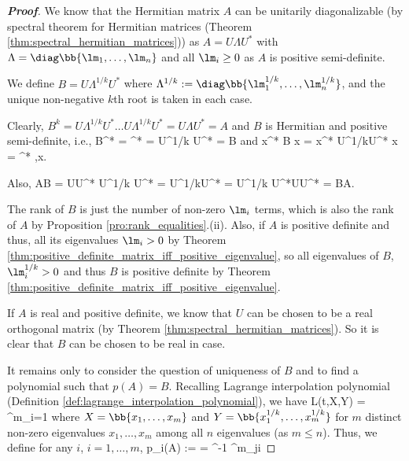 \begin{proof}[\bf Proof]
We know that the Hermitian matrix $A$ can be unitarily diagonalizable (by spectral theorem for Hermitian matrices (Theorem \ref{thm:spectral_hermitian_matrices})) as $A = U\Lambda U^*$ with $\Lambda
= \diag\bb{\lm_1,\dots,\lm_n}$ and all $\lm_i \geq 0$ as $A$ is positive semi-definite.

We define $B = U\Lambda^{1/k} U^*$ where $\Lambda^{1/k} := \diag\bb{\lm_1^{1/k},\dots,\lm_n^{1/k}}$, and the unique non-negative $k$th root is taken in each case.

Clearly, $B^k = U\Lambda^{1/k}U^* \dots U\Lambda^{1/k}U^* = U\Lambda U^* = A$ and $B$ is Hermitian and positive semi-definite, i.e.,
\be
B^* = ^* = U\Lambda^{1/k} U^* = B\qquad {}
\ee
and
\be
x^* B x = x^* U\Lambda^{1/k}U^* x = ^*  ,\qquad \forall x.
\ee

Also,
\be
AB = U\Lambda U^* U\Lambda^{1/k} U^* = U\Lambda^{1/k}\Lambda U^* = U\Lambda^{1/k} U^*U\Lambda U^* = BA.
\ee

The rank of $B$ is just the number of non-zero $\lm_i$ terms, which is also the rank of $A$ by Proposition \ref{pro:rank_equalities}.(ii). Also, if $A$ is positive definite and thus, all its
eigenvalues $\lm_i>0$ by Theorem \ref{thm:positive_definite_matrix_iff_positive_eigenvalue}, so all eigenvalues of $B$, $\lm_i^{1/k} >0$ and thus $B$ is positive definite by Theorem
\ref{thm:positive_definite_matrix_iff_positive_eigenvalue}.

If $A$ is real and positive definite, we know that $U$ can be chosen to be a real orthogonal matrix (by Theorem \ref{thm:spectral_hermitian_matrices}). So it is clear that $B$ can be chosen to be
real in case.

It remains only to consider the question of uniqueness of $B$ and to find a polynomial such that $p(A) = B$. Recalling Lagrange interpolation polynomial (Definition
\ref{def:lagrange_interpolation_polynomial}), we have
\be
L(t,X,Y) = \sum^m_{i=1} 
\ee
where $X = \bb{x_1,\dots,x_m}$ and $Y= \bb{x_1^{1/k},\dots,x_m^{1/k}}$ for $m$ distinct non-zero eigenvalues $x_1,\dots,x_m$ among all $n$ eigenvalues (as $m\leq n$). Thus, we define for any $i$, $i=1,\dots,m$,
\be
p_i(A) :=  = ^{-1}  \prod^m_{j\neq i}
\ee


\end{proof}
